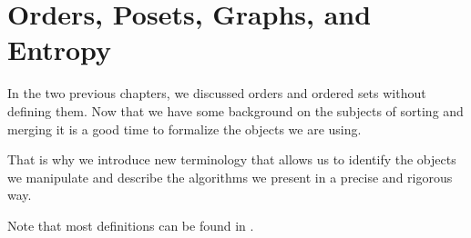 \chapter{Orders, Posets, Graphs, and Entropy}

In the two previous chapters, we discussed orders and ordered sets without
defining them. Now that we have some background on the subjects of
sorting and merging it is a good time to formalize the objects we are using.

That is why we introduce new terminology that allows
us to identify the objects we manipulate and describe the algorithms we present
in a precise and rigorous way.

Note that most definitions can be found in \citet*{Stanley:2011:ECV:2124415}.
